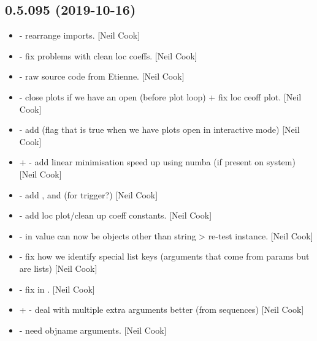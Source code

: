 \documentclass[a4paper,10pt,english]{report}
\begin{document}
\subsection{0.5.095 (2019-10-16)}
\label{\detokenize{misc/changelog:id48}}\begin{itemize}
\item {} 
 - rearrange imports. {[}Neil Cook{]}

\item {} 
 - fix problems with clean loc coeffs.
{[}Neil Cook{]}

\item {} 
 - raw source code from Etienne. {[}Neil Cook{]}

\item {} 
 - close plots if we have an open (before
plot loop) + fix loc ceoff plot. {[}Neil Cook{]}

\item {} 
 - add  (flag that is true when we have
plots open in interactive mode) {[}Neil Cook{]}

\item {} 
 +  - add linear minimisation speed up
using numba (if present on system) {[}Neil Cook{]}

\item {} 
 - add ,
 and  (for trigger?) {[}Neil Cook{]}

\item {} 
 - add loc plot/clean up coeff
constants. {[}Neil Cook{]}

\item {} 
 - in  value can now be objects other
than string \textendash{}\textgreater{} re-test instance. {[}Neil Cook{]}

\item {} 
 - fix how we identify special list keys
(arguments that come from params but are lists) {[}Neil Cook{]}

\item {} 
 - fix  in . {[}Neil Cook{]}

\item {} 
 +  - deal
with multiple extra arguments better (from sequences) {[}Neil Cook{]}

\item {} 
 -  need
objname arguments. {[}Neil Cook{]}

\end{itemize}
\end{document}
